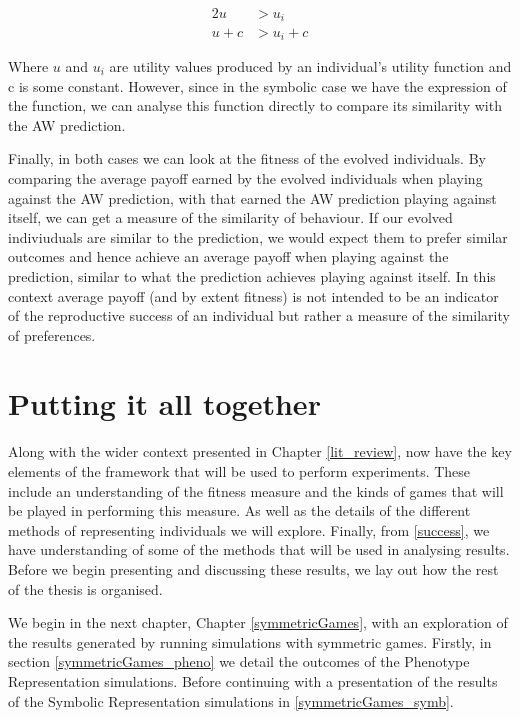 \documentclass[11pt]{book}
\newcommand*{\np}{\par\noindent\newline}
\begin{document}
	\begin{alignat*}{2}
	u & > u_i \\
	u + c & > u_i +c
	\end{alignat*}

Where $u$ and $u_i$ are utility values produced by an individual's utility function and c is some constant.
However, since in the symbolic case we have the expression of the function, we can analyse this function directly to compare its similarity with the AW prediction.

\np Finally, in both cases we can look at the fitness of the evolved individuals.
By comparing the average payoff earned by the evolved individuals when playing against the AW prediction, with that earned the AW prediction playing against itself, we can get a measure of the similarity of behaviour.
If our evolved indiviuduals are similar to the prediction, we would expect them to prefer similar outcomes and hence achieve an average payoff when playing against the prediction, similar to what the prediction achieves playing against itself.
In this context average payoff (and by extent fitness) is not intended to be an indicator of the reproductive success of an individual but rather a measure of the similarity of preferences.

\section{Putting it all together}

Along with the wider context presented in Chapter \ref{lit_review}, now have the key elements of the framework that will be used to perform experiments.
These include an understanding of the fitness measure and the kinds of games that will be played in performing this measure.
As well as the details of the different methods of representing individuals we will explore.
Finally, from \ref{success}, we have understanding of some of the methods that will be used in analysing results.
Before we begin presenting and discussing these results, we lay out how the rest of the thesis is organised.

\np We begin in the next chapter, Chapter \ref{symmetricGames}, with an exploration of the results generated by running simulations with symmetric games.
Firstly, in section \ref{symmetricGames_pheno} we detail the outcomes of the Phenotype Representation simulations.
Before continuing with a presentation of the results of the Symbolic Representation simulations in \ref{symmetricGames_symb}.
\end{document}
